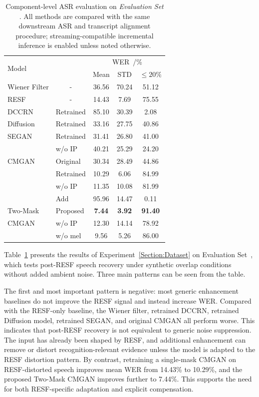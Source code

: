 \documentclass[manuscript,screen,review]{acmart}
\newcommand{\RomanNumeralCaps}[1]
    {\MakeUppercase{\romannumeral #1}}
\begin{document}
\begin{table}[ht]
\centering
\caption{Component-level ASR evaluation on \textit{Evaluation Set \RomanNumeralCaps{1}}. All methods are compared with the same downstream ASR and transcript alignment procedure; streaming-compatible incremental inference is enabled unless noted otherwise.}
\begin{tabular}{llccc}
\hline
\multirow{2}{*}{Model} & \multirow{2}{*}{} & \multicolumn{3}{c}{WER~/\%} \\
 &  & Mean & STD & $\leq 20\%$  \\ \hline
Wiener Filter & \multicolumn{1}{c}{-} & 36.56 & 70.24 & 51.12  \\
RESF & \multicolumn{1}{c}{-} & 14.43 & 7.69 & 75.55 \\
DCCRN & \multicolumn{1}{c}{Retrained} & 85.10 & 30.39 & 2.08 \\
Diffusion & \multicolumn{1}{c}{Retrained} & 33.16& 27.75 & 40.86  \\
SEGAN & Retrained & 31.41 & 26.80 & 41.00 \\
 & w/o IP & 40.21 & 25.29 & 24.20 \\
 
CMGAN & Original & 30.34 & 28.49 & 44.86 \\
 & Retrained & 10.29 & 6.06 & 84.99 \\
 & w/o IP & 11.35 & 10.08 &  81.99   \\
& Add & 95.96 & 14.47 &  0.11 \\
Two-Mask  & Proposed & \textbf{7.44} & \textbf{3.92} & \textbf{91.40} \\
 CMGAN& w/o IP & 12.30 & 14.14 & 78.92 \\
 & w/o mel & 9.56 & 5.26 & 86.00 \\ \hline
\end{tabular}
\label{tab:1}
\end{table}
Table~\ref{tab:1} presents the results of Experiment~\ref{Section:Dataset} on Evaluation Set~\RomanNumeralCaps{1}, which tests post-RESF speech recovery under synthetic overlap conditions without added ambient noise. Three main patterns can be seen from the table. 

The first and most important pattern is negative: most generic enhancement baselines do not improve the RESF signal and instead increase WER. Compared with the RESF-only baseline, the Wiener filter, retrained DCCRN, retrained Diffusion model, retrained SEGAN, and original CMGAN all perform worse. This indicates that post-RESF recovery is not equivalent to generic noise suppression. The input has already been shaped by RESF, and additional enhancement can remove or distort recognition-relevant evidence unless the model is adapted to the RESF distortion pattern. By contrast, retraining a single-mask CMGAN on RESF-distorted speech improves mean WER from 14.43\% to 10.29\%, and the proposed Two-Mask CMGAN improves further to 7.44\%. This supports the need for both RESF-specific adaptation and explicit compensation.
\end{document}

